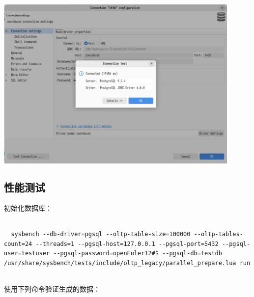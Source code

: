 \documentclass{article}
\begin{document}
\begin{center}
\includegraphics[width=12cm]{./image/5.png}
\end{center}


\subsection{性能测试}

初始化数据库：

\begin{verbatim}
  
  sysbench --db-driver=pgsql --oltp-table-size=100000 --oltp-tables-count=24 --threads=1 --pgsql-host=127.0.0.1 --pgsql-port=5432 --pgsql-user=testuser --pgsql-password=openEuler12#$ --pgsql-db=testdb  /usr/share/sysbench/tests/include/oltp_legacy/parallel_prepare.lua run
  
\end{verbatim}

使用下列命令验证生成的数据：
\end{document}
